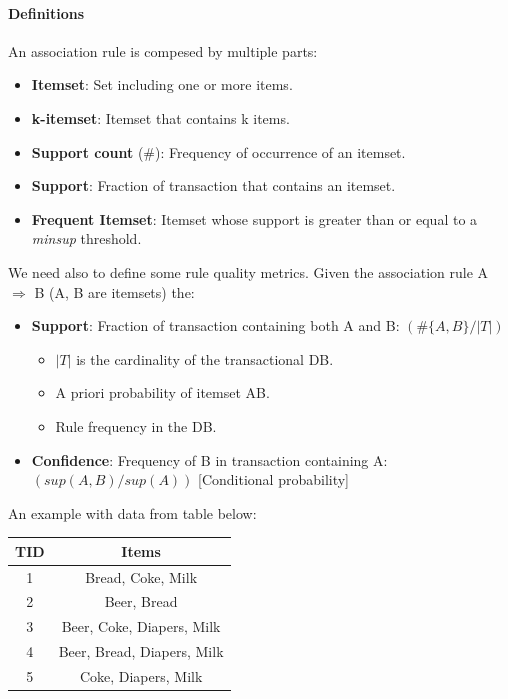 \documentclass[12pt]{article}
\begin{document}
\paragraph{Definitions} An association rule is compesed by multiple parts:
\begin{itemize}
  \item \textbf{Itemset}: Set including one or more items.
  \item \textbf{k-itemset}: Itemset that contains k items.
  \item \textbf{Support count} (\#): Frequency of occurrence of an itemset.
  \item \textbf{Support}: Fraction of transaction that contains an itemset.
  \item \textbf{Frequent Itemset}: Itemset whose support is greater than or equal to a \textit{minsup} threshold.
\end{itemize}
We need also to define some rule quality metrics. Given the association rule A $\Rightarrow$ B (A, B are itemsets) the:
\begin{itemize}
  \item \textbf{Support}: Fraction of transaction containing both A and B: $(\#\{A,B\}/|T|)$
  \begin{itemize}
    \item $|T|$ is the cardinality of the transactional DB.
    \item A priori probability of itemset AB.
    \item Rule frequency in the DB.
  \end{itemize}
  \item \textbf{Confidence}: Frequency of B in transaction containing A: $(sup(A,B)/sup(A))$ [Conditional probability]
\end{itemize}
An example with data from table below:
\begin{center}
  \begin{tabular}{ |c|c| }
    \hline
    \textbf{TID} & \textbf{Items}\\
    \hline
    \hline
    1 & Bread, Coke, Milk\\
    \hline
    2 & Beer, Bread\\
    \hline
    3 & Beer, Coke, Diapers, Milk\\
    \hline
    4 & Beer, Bread, Diapers, Milk\\
    \hline
    5 & Coke, Diapers, Milk\\
    \hline
  \end{tabular}
\end{center}
\end{document}
